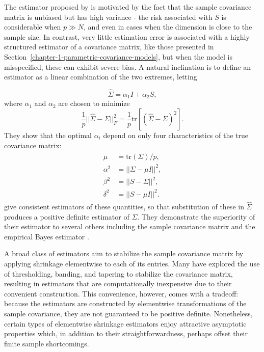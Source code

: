 The estimator proposed by \cite{ledoit2004well} is motivated by the fact that the sample covariance matrix is unbiased but has high variance - the risk associated with $S$ is considerable when $p \gg N$, and even in cases when the dimension is close to the sample size. In contrast, very little estimation error is associated with a highly structured estimator of a covariance matrix, like those presented in Section~\ref{chapter-1-parametric-covariance-models}, but when the model is misspecified, these can exhibit severe bias. A natural inclination is to define an estimator as a linear combination of the two extremes, letting

\begin{equation} \label{eq:ledoit-wolf-estimator}
\hat{\Sigma} = \alpha_1 I + \alpha_2 S,
\end{equation}
\noindent
where $\alpha_1$ and $\alpha_2$ are chosen to minimize 
\[
\frac{1}{p} \vert \vert\hat{\Sigma}-\Sigma   \vert \vert_{F}^2 = \frac{1}{p} \mbox{tr}\left[ \left(\hat{\Sigma}-\Sigma \right)^2\right].
\] 
\noindent
They show that the optimal $\alpha_i$ depend on only four characteristics of the true covariance matrix:
\begin{align}
\begin{split}
\mu &= \mbox{tr}\left(\Sigma\right)/p, \\
\alpha^2 &= \vert\vert \Sigma - \mu I\vert\vert^2, \\
\beta^2 &= \vert\vert S - \Sigma  \vert\vert^2, \\
\delta^2 &= \vert\vert S - \mu I\vert\vert^2.
\end{split}
\end{align}
\noindent
\cite{ledoit2004well} give consistent estimators of these quantities, so that substitution of these in $\hat{\Sigma}$ produces a positive definite estimator of $\Sigma$. They demonstrate the superiority of their estimator to several others including the sample covariance matrix and the empirical Bayes estimator \citep{haff1980empirical}.


\bigskip


A broad class of estimators aim to stabilize the sample covariance matrix by applying shrinkage elementwise to each of its entries. Many have explored the use of thresholding, banding, and tapering to stabilize the covariance matrix, resulting in estimators that are computationally inexpensive due to their convenient construction. This convenience, however, comes with a tradeoff: because the estimators are constructed by elementwise transformations of the sample covariance, they are not guaranteed to be positive definite.  Nonetheless, certain types of elementwise shrinkage estimators enjoy attractive asymptotic properties \citep{bickel2008regularized} which, in addition to their straightforwardness, perhaps  offset their finite sample shortcomings. 



